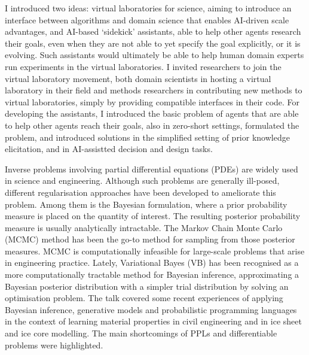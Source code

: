 \documentclass[a4paper,UKenglish]{dagrep-v2021}
\begin{document}
I introduced two ideas: virtual laboratories for science, aiming to introduce an interface between algorithms and domain science that enables AI-driven scale advantages, and AI-based ‘sidekick’ assistants, able to help other agents research their goals, even when they are not able to yet specify the goal explicitly, or it is evolving. Such assistants would ultimately be able to help human domain experts run experiments in the virtual laboratories. I invited researchers to join the virtual laboratory movement, both domain scientists in hosting a virtual laboratory in their field and methods researchers in contributing new methods to virtual laboratories, simply by providing compatible interfaces in their code. For developing the assistants, I introduced the basic problem of agents that are able to help other agents reach their goals, also in zero-short settings, formulated the problem, and introduced solutions in the simplified setting of prior knowledge elicitation, and in AI-assistted decision and design tasks.

\license

Inverse problems involving partial differential equations (PDEs) are widely used in science and engineering. Although such problems are generally ill-posed, different regularisation approaches have been developed to ameliorate this problem. Among them is the Bayesian formulation, where a prior probability measure is placed on the quantity of interest. The resulting posterior probability measure is usually analytically intractable. The Markov Chain Monte Carlo (MCMC) method has been the go-to method for sampling from those posterior measures. MCMC is computationally infeasible for large-scale problems that arise in engineering practice. Lately, Variational Bayes (VB) has been recognised as a more computationally tractable method for Bayesian inference, approximating a Bayesian posterior distribution with a simpler trial distribution by solving an optimisation problem. The talk covered some recent experiences of applying Bayesian inference, generative models and probabilistic programming languages in the context of learning material properties in civil engineering and in ice sheet and ice core modelling. The main shortcomings of PPLs and differentiable problems were highlighted.

\license
\end{document}

